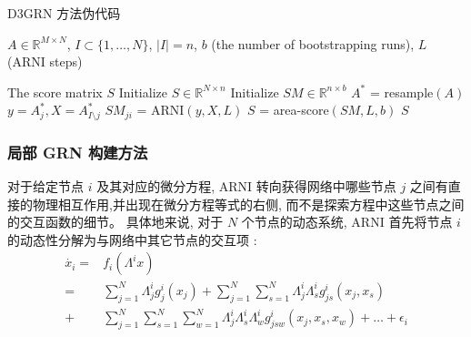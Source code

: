 \begin{algorithm}
  \caption{D3GRN 方法伪代码}
  \label{alg:D3GRN}
  \begin{algorithmic}[1]
  \Require  $A \in \mathbb{R}^{M \times N}$, $I \subset \{1,\ldots,N\}$, 
            $|I| = n$,
            $b$ (the number of bootstrapping runs), $L$ (ARNI steps) %
  
  \Ensure The score matrix $S$ 
  \State Initialize $S \in \mathbb{R}^{N \times n}$     
  \State Initialize $SM \in \mathbb{R}^{n \times b}$     
                                     
        \State $A^{*}$ = resample$(A)$                  
                                              
        \State $y = A^{*}_j, X = A^{*}_{I\setminus j}$
        \State $SM_{ji}$ = ARNI$(y,X,L)$                    
        \EndFor
  \EndFor           
  \State $S$ = area-score$(SM,L,b)$                      
  \State \Return $S$                                    
\end{algorithmic}
\end{algorithm}

\subsubsection{局部 GRN 构建方法}

对于给定节点 $i$ 及其对应的微分方程, 
ARNI 转向获得网络中哪些节点 $j$ 之间有直接的物理相互作用,并出现在微分方程等式的右侧, 
而不是探索方程中这些节点之间的交互函数的细节。
具体地来说, 对于 $N$ 个节点的动态系统, 
ARNI 首先将节点 $i$ 的动态性分解为与网络中其它节点的交互项 \cite{casadiego2017model}:
\begin{equation}
\label{eq:xi}
\begin{split}
\dot{x_i}= & f_i(\Lambda ^i x)\\
         = &\sum_{j=1}^{N} \Lambda^i_{j} g^i_j(x_j) + 
                             \sum_{j=1}^{N} \sum_{s=1}^{N}\Lambda^i_{j}\Lambda^i_{s}g^i_{js}(x_j,x_s)\\
         + &\sum_{j=1}^{N} \sum_{s=1}^{N} \sum_{w=1}^{N}\Lambda^i_{j}\Lambda^i_{s}\Lambda^i_{w}g^i_{jsw}(x_j,x_s,x_w)+ \ldots + \epsilon_{i}
\end{split}
\end{equation}

